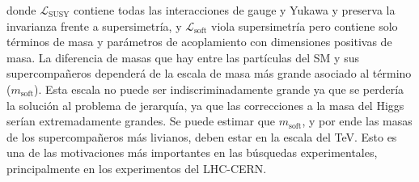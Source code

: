 donde $\mathcal{L}_{\text{SUSY}}$ contiene todas las interacciones de gauge y Yukawa y preserva la invarianza frente a supersimetría, y $\mathcal{L}_{\text{soft}}$ viola supersimetría pero contiene solo términos de masa y parámetros de acoplamiento con dimensiones positivas de masa. La diferencia de masas que hay entre las partículas del SM y sus supercompañeros dependerá de la escala de masa más grande asociado al término  ($m_{\text{soft}}$). Esta escala no puede ser indiscriminadamente grande ya que se perdería la solución al problema de jerarquía, ya que las correcciones a la masa del Higgs serían extremadamente grandes. Se puede estimar que $m_{\text{soft}}$, y por ende las masas de los supercompañeros más livianos, deben estar en la escala del TeV. Esto es una de las motivaciones más importantes en las búsquedas experimentales, principalmente en los experimentos del LHC-CERN.


